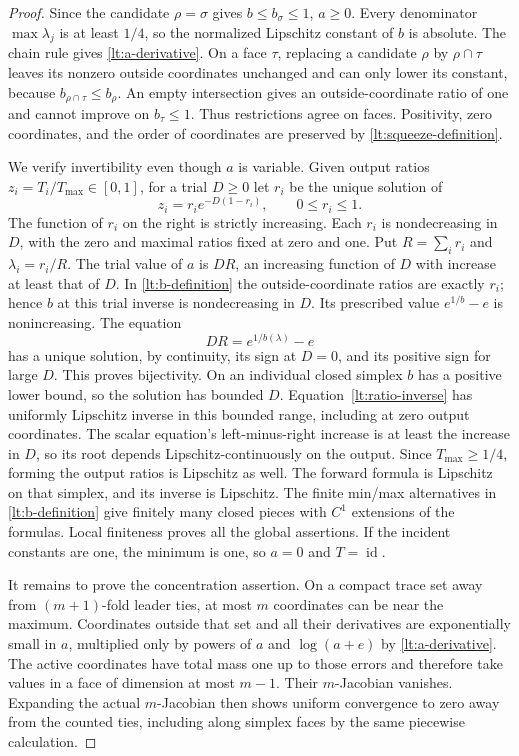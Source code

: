 \documentclass[11pt]{article}
\numberwithin{equation}{section}
\theoremstyle{definition}
\theoremstyle{remark}
\begin{document}
\begin{proof}
Since the candidate $\rho=\sigma$ gives $b\leq b_\sigma\leq1$,
$a\geq0$.  Every denominator $\max\lambda_j$ is at least $1/4$,
so the normalized Lipschitz constant of $b$ is absolute.  The chain
rule gives \eqref{lt:a-derivative}.  On a face $\tau$, replacing a
candidate $\rho$ by $\rho\cap\tau$ leaves its nonzero outside
coordinates unchanged and can only lower its constant, because
$b_{\rho\cap\tau}\leq b_\rho$.  An empty intersection gives an
outside-coordinate ratio of one and cannot improve on $b_\tau\leq1$.
Thus restrictions agree on faces.  Positivity, zero coordinates, and
the order of coordinates are preserved by \eqref{lt:squeeze-definition}.

We verify invertibility even though $a$ is variable.  Given output
ratios $z_i=T_i/T_{\max}\in[0,1]$, for a trial $D\geq0$ let $r_i$
be the unique solution of
\begin{equation}
 z_i=r_i e^{-D(1-r_i)},\qquad 0\leq r_i\leq1.
 \label{lt:ratio-inverse}
\end{equation}
The function of $r_i$ on the right is strictly increasing.  Each
$r_i$ is nondecreasing in $D$, with the zero and maximal ratios fixed
at zero and one.  Put $R=\sum_i r_i$ and $\lambda_i=r_i/R$.
The trial value of $a$ is $DR$, an increasing function of $D$ with
increase at least that of $D$.  In \eqref{lt:b-definition} the
outside-coordinate ratios are exactly $r_i$; hence $b$ at this trial
inverse is nondecreasing in $D$.  Its prescribed value
$e^{1/b}-e$ is nonincreasing.  The equation
\[
 DR=e^{1/b(\lambda)}-e
\]
has a unique solution, by continuity, its sign at $D=0$, and its
positive sign for large $D$.  This proves bijectivity.
On an individual closed simplex $b$ has a positive lower bound, so
the solution has bounded $D$.  Equation~\eqref{lt:ratio-inverse}
has uniformly Lipschitz inverse in this bounded range, including at
zero output coordinates.  The scalar equation's left-minus-right
increase is at least the increase in $D$, so its root depends
Lipschitz-continuously on the output.  Since $T_{\max}\geq1/4$,
forming the output ratios is Lipschitz as well.  The forward formula
is Lipschitz on that simplex, and its inverse is Lipschitz.  The
finite min/max alternatives in \eqref{lt:b-definition} give finitely
many closed pieces with $C^1$ extensions of the formulas.  Local
finiteness proves all the global assertions.  If the incident
constants are one, the minimum is one, so $a=0$ and $T=\operatorname{id}$.

It remains to prove the concentration assertion.  On a compact trace
set away from $(m+1)$-fold leader ties, at most $m$ coordinates can be
near the maximum.  Coordinates outside that set and all their
derivatives are exponentially small in $a$, multiplied only by
powers of $a$ and $\log(a+e)$ by \eqref{lt:a-derivative}.  The active
coordinates have total mass one up to those errors and therefore
take values in a face of dimension at most $m-1$.  Their $m$-Jacobian
vanishes.  Expanding the actual $m$-Jacobian then shows uniform
convergence to zero away from the counted ties, including along
simplex faces by the same piecewise calculation.


\end{proof}
\end{document}
